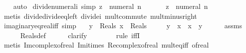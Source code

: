 \begin{isabellebody}
%
\isadelimproof
\ \ %
\endisadelimproof
%
\isatagproof
{}\isamarkupfalse%
\ auto%
\endisatagproof
{\isafoldproof}%
%
\isadelimproof
\isanewline
%
\endisadelimproof
\isanewline
{}\isamarkupfalse%
\ divide{\isacharunderscore}{\kern0pt}numeral{\isacharunderscore}{\kern0pt}i\ {\isacharbrackleft}{\kern0pt}simp{\isacharbrackright}{\kern0pt}{\isacharcolon}{\kern0pt}\ {\isachardoublequoteopen}z\ {\isacharslash}{\kern0pt}\ {\isacharparenleft}{\kern0pt}numeral\ n\ {\isacharasterisk}{\kern0pt}\ {\isasymi}{\isacharparenright}{\kern0pt}\ {\isacharequal}{\kern0pt}\ {\isacharminus}{\kern0pt}\ {\isacharparenleft}{\kern0pt}{\isasymi}\ {\isacharasterisk}{\kern0pt}\ z{\isacharparenright}{\kern0pt}\ {\isacharslash}{\kern0pt}\ numeral\ n{\isachardoublequoteclose}\isanewline
%
\isadelimproof
\ \ %
\endisadelimproof
%
\isatagproof
{}\isamarkupfalse%
\ {\isacharparenleft}{\kern0pt}metis\ divide{\isacharunderscore}{\kern0pt}divide{\isacharunderscore}{\kern0pt}eq{\isacharunderscore}{\kern0pt}left\ divide{\isacharunderscore}{\kern0pt}i\ mult{\isachardot}{\kern0pt}commute\ mult{\isacharunderscore}{\kern0pt}minus{\isacharunderscore}{\kern0pt}right{\isacharparenright}{\kern0pt}%
\endisatagproof
{\isafoldproof}%
%
\isadelimproof
\isanewline
%
\endisadelimproof
\isanewline
{}\isamarkupfalse%
\ imaginary{\isacharunderscore}{\kern0pt}eq{\isacharunderscore}{\kern0pt}real{\isacharunderscore}{\kern0pt}iff\ {\isacharbrackleft}{\kern0pt}simp{\isacharbrackright}{\kern0pt}{\isacharcolon}{\kern0pt}\isanewline
\ \ \ {\isachardoublequoteopen}y\ {\isasymin}\ Reals{\isachardoublequoteclose}\ {\isachardoublequoteopen}x\ {\isasymin}\ Reals{\isachardoublequoteclose}\isanewline
\ \ \ {\isachardoublequoteopen}{\isasymi}\ {\isacharasterisk}{\kern0pt}\ y\ {\isacharequal}{\kern0pt}\ x\ {\isasymlongleftrightarrow}\ x{\isacharequal}{\kern0pt}{}\ {\isasymand}\ y{\isacharequal}{\kern0pt}{}{\isachardoublequoteclose}\isanewline
%
\isadelimproof
\ \ \ \ %
\endisadelimproof
%
\isatagproof
{}\isamarkupfalse%
\ assms\isanewline
\ \ \ \ \isamarkupfalse%
\ Reals{\isacharunderscore}{\kern0pt}def\isanewline
\ \ \ \ \isamarkupfalse%
\ clarify\isanewline
\ \ \ \ \ \ \isamarkupfalse%
\ {\isacharparenleft}{\kern0pt}rule\ iffI{\isacharparenright}{\kern0pt}\isanewline
\ \ \ \ \isamarkupfalse%
\ {\isacharparenleft}{\kern0pt}metis\ Im{\isacharunderscore}{\kern0pt}complex{\isacharunderscore}{\kern0pt}of{\isacharunderscore}{\kern0pt}real\ Im{\isacharunderscore}{\kern0pt}i{\isacharunderscore}{\kern0pt}times\ Re{\isacharunderscore}{\kern0pt}complex{\isacharunderscore}{\kern0pt}of{\isacharunderscore}{\kern0pt}real\ mult{\isacharunderscore}{\kern0pt}eq{\isacharunderscore}{\kern0pt}{}{\isacharunderscore}{\kern0pt}iff\ of{\isacharunderscore}{\kern0pt}real{\isacharunderscore}{\kern0pt}{}{\isacharparenright}{\kern0pt}\isanewline

\end{isabellebody}
